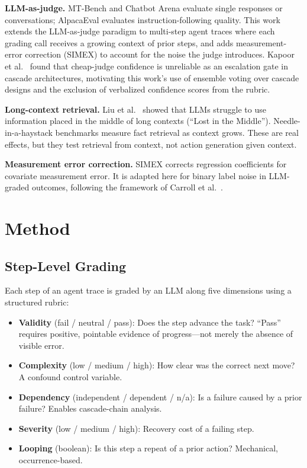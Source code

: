 \documentclass[11pt]{article}
\begin{document}
\textbf{LLM-as-judge.}
MT-Bench and Chatbot Arena \citep{zheng2023judging} evaluate single responses or conversations; AlpacaEval \citep{alpacaeval} evaluates instruction-following quality.
This work extends the LLM-as-judge paradigm to multi-step agent traces where each grading call receives a growing context of prior steps, and adds measurement-error correction (SIMEX) to account for the noise the judge introduces.
Kapoor et al.\ \citep{kapoor2024scalable} found that cheap-judge confidence is unreliable as an escalation gate in cascade architectures, motivating this work's use of ensemble voting \citep{wang2022selfconsistency} over cascade designs and the exclusion of verbalized confidence scores from the rubric.

\textbf{Long-context retrieval.}
Liu et al.\ \citep{liu2024lost} showed that LLMs struggle to use information placed in the middle of long contexts (``Lost in the Middle'').
Needle-in-a-haystack benchmarks measure fact retrieval as context grows.
These are real effects, but they test retrieval from context, not action generation given context.

\textbf{Measurement error correction.}
SIMEX \citep{cook1994simulation} corrects regression coefficients for covariate measurement error.
It is adapted here for binary label noise in LLM-graded outcomes, following the framework of Carroll et al.\ \citep{carroll2006measurement}.

\section{Method}

\subsection{Step-Level Grading}

Each step of an agent trace is graded by an LLM along five dimensions using a structured rubric:

\begin{itemize}
    \item \textbf{Validity} (fail / neutral / pass): Does the step advance the task? ``Pass'' requires positive, pointable evidence of progress---not merely the absence of visible error.
    \item \textbf{Complexity} (low / medium / high): How clear was the correct next move? A confound control variable.
    \item \textbf{Dependency} (independent / dependent / n/a): Is a failure caused by a prior failure? Enables cascade-chain analysis.
    \item \textbf{Severity} (low / medium / high): Recovery cost of a failing step.
    \item \textbf{Looping} (boolean): Is this step a repeat of a prior action? Mechanical, occurrence-based.
\end{itemize}
\end{document}
